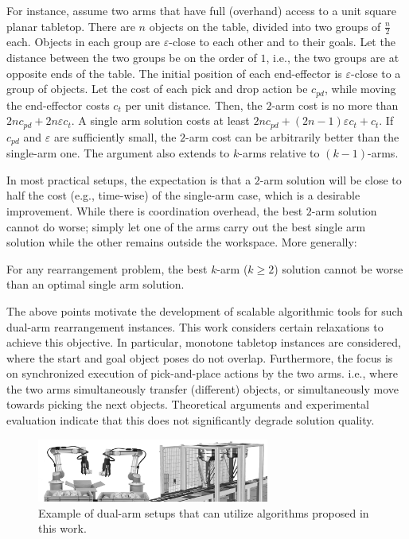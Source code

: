 For instance, assume two arms that have full (overhand) access to a 
unit square planar tabletop. There are $n$ objects on the table, 
divided into two groups of $\frac{n}{2}$ each. Objects in each group 
are $\varepsilon$-close to each other and to their goals. Let the 
distance between the two groups be on the order of $1$, i.e., the two 
groups are at opposite ends of the table. The initial position of each 
end-effector is $\varepsilon$-close to a group of objects. Let the cost 
of each pick and drop action be $c_{pd}$, while moving the 
end-effector costs $c_t$ per unit distance. Then, the $2$-arm 
cost is no more than $2nc_{pd} + 2n\varepsilon c_t $.  A single arm 
solution costs at least $2nc_{pd} + (2n-1)\varepsilon c_t + 
c_t$. If $c_{pd}$ and $\varepsilon$ are sufficiently small, the $2$-arm 
cost can be arbitrarily better than the single-arm one. The argument 
also extends to $k$-arms relative to $(k-1)$-arms.

In most practical setups, the expectation is that a $2$-arm solution
will be close to half the cost (e.g., time-wise) of the single-arm 
case, which is a desirable improvement. While there 
is coordination overhead, the best $2$-arm solution cannot do worse; simply 
let one of the arms carry out the best single arm solution while the 
other remains outside the workspace. More generally:

\begin{lemma}\label{l:2-arm-no-worse}
For any rearrangement problem, the best $k$-arm ($k \ge 2$) solution
cannot be worse than an optimal single arm solution.
\end{lemma}

The above points motivate the development of scalable algorithmic
tools for such dual-arm rearrangement instances. This work considers
certain relaxations to achieve this objective. In particular,
monotone tabletop instances are considered, where the start and goal
object poses do not overlap.  Furthermore, the focus is on
synchronized execution of pick-and-place actions by the two arms. i.e., where the two arms simultaneously transfer (different) objects, or simultaneously move towards picking the next objects.
Theoretical arguments and experimental evaluation indicate that this does not significantly degrade solution
quality.

\begin{figure}[t]
	\centering
	\includegraphics[width=3in]{figures/two_arms}
	\caption{Example of dual-arm setups that can utilize
	algorithms proposed in this work.}
	\label{fig:two_arms}
\end{figure}



